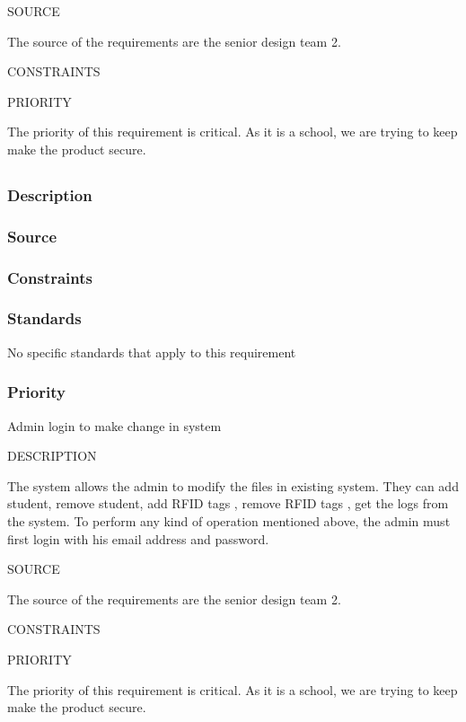 SOURCE


The source of the requirements are the senior design team 2.

CONSTRAINTS


PRIORITY

The priority of this requirement is critical. As it is a school, we are trying to keep make the product secure.



\subsection{}
\subsubsection{Description}

\subsubsection{Source}

\subsubsection{Constraints}

\subsubsection{Standards}
No specific standards that apply to this requirement
\subsubsection{Priority}


Admin login to make change in system

DESCRIPTION

The system allows the admin to modify the files in existing system. They can add student, remove student, add RFID tags , remove RFID tags , get the logs from the system. To perform any kind of operation mentioned above, the admin must first login with his email address and password.

SOURCE


The source of the requirements are the senior design team 2.

CONSTRAINTS



PRIORITY

The priority of this requirement is critical. As it is a school, we are trying to keep make the product secure.




